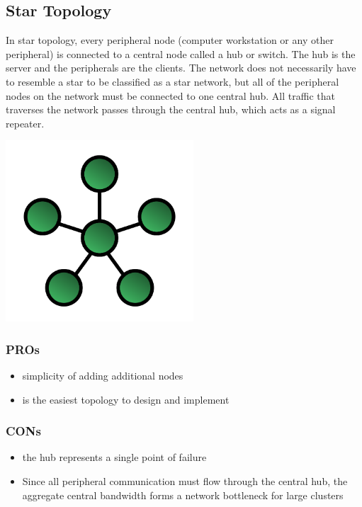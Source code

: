 \documentclass[a4paper,12pt]{article}
\begin{document}
\subsection{Star Topology}

In star topology, every peripheral node (computer workstation or any other peripheral) is connected to a central node called a hub or switch. The hub is the server and the peripherals are the clients. The network does not necessarily have to resemble a star to be classified as a star network, but all of the peripheral nodes on the network must be connected to one central hub. All traffic that traverses the network passes through the central hub, which acts as a signal repeater.

\noindent \includegraphics[width=7cm]{./StarNetwork.svg.PNG} \newline

\subsubsection{PROs}

\begin{itemize}
\item {simplicity of adding additional nodes}
\item {is the easiest topology to design and implement}
\end{itemize}

\subsubsection{CONs}

\begin{itemize}
\item {the hub represents a single point of failure}
\item {Since all peripheral communication must flow through the central hub, the aggregate central bandwidth forms a network bottleneck for large clusters}
\end{itemize}
\end{document}
